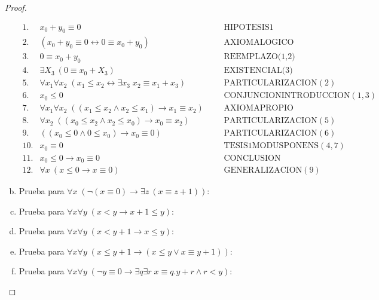 \begin{proof}
\begin{enumerate}[(a)]
          $\begin{array}{lllll}
            1. & x_{0} + y_{0} \equiv 0 &&& \text{HIPOTESIS}1 \\
            2. & (x_{0} + y_{0} \equiv 0 \leftrightarrow 0 \equiv x_{0} + y_{0}) &&& \text{AXIOMALOGICO} \\
            3. & 0\equiv x_{0} + y_{0} &&& \text{REEMPLAZO(1,2)} \\
            4. & \exists X_{3} \ (0 \equiv x_{0} + X_{3}) &&& \text{EXISTENCIAL(3)} \\
            5. & \forall x_{1}\forall x_{2}\;(x_{1}\leq x_{2}\leftrightarrow \exists x_{3}\;x_{2}\equiv x_{1}+x_{3}) &&& \text{PARTICULARIZACION}(2) \\
            6. & x_{0}\leq 0 &&& \text{CONJUNCIONINTRODUCCION}(1,3) \\
            7. & \forall x_{1}\forall x_{2}\;((x_{1}\leq x_{2}\wedge x_{2}\leq x_{1})\rightarrow x_{1}\equiv x_{2}) &&& \text{AXIOMAPROPIO} \\
            8. & \forall x_{2}\;((x_{0}\leq x_{2}\wedge x_{2}\leq x_{0})\rightarrow x_{0}\equiv x_{2}) &&& \text{PARTICULARIZACION}(5) \\
            9. & ((x_{0}\leq 0\wedge 0\leq x_{0})\rightarrow x_{0}\equiv 0) &&& \text{PARTICULARIZACION}(6) \\
            10. & x_{0}\equiv 0 &&& \text{TESIS}1\text{MODUSPONENS}(4,7) \\
            11. & x_{0} \leq 0 \rightarrow x_{0} \equiv 0 &&& \text{CONCLUSION} \\
            12. & \forall x \ (x \leq 0 \rightarrow x \equiv 0) &&& \text{GENERALIZACION}(9)
          \end{array}$

        \item Prueba para $\forall x \; (\lnot (x \equiv 0) \rightarrow \exists z \ (x \equiv z + 1))$:
        \item Prueba para $\forall x \forall y \; (x < y \rightarrow x + 1 \leq y)$:
        \item Prueba para $\forall x \forall y \; (x < y + 1 \rightarrow x \leq y)$:
        \item Prueba para $\forall x \forall y \; (x \leq y+1 \rightarrow (x \leq y \vee x \equiv y+1))$:
        \item Prueba para $\forall x \forall y \; (\lnot y \equiv 0 \rightarrow \exists q \exists r \; x \equiv q.y+r
          \wedge r < y)$:
    \end{enumerate}
  \end{proof}

